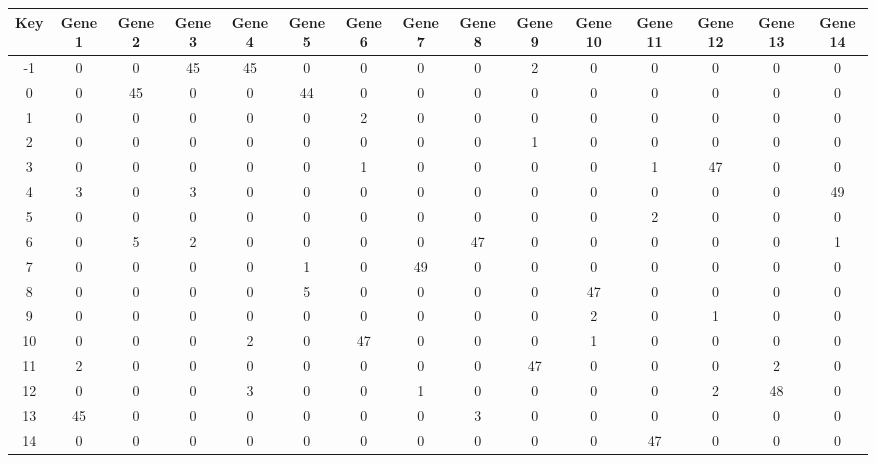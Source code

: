 \begin{tabular}{|c|c|c|c|c|c|c|c|c|c|c|c|c|c|c|}
\hline
Key & Gene 1 & Gene 2 & Gene 3 & Gene 4 & Gene 5 & Gene 6 & Gene 7 & Gene 8 & Gene 9 & Gene 10 & Gene 11 & Gene 12 & Gene 13 & Gene 14 \\
\hline
-1 & 0 & 0 & 45 & 45 & 0 & 0 & 0 & 0 & 2 & 0 & 0 & 0 & 0 & 0 \\
0 & 0 & 45 & 0 & 0 & 44 & 0 & 0 & 0 & 0 & 0 & 0 & 0 & 0 & 0 \\
1 & 0 & 0 & 0 & 0 & 0 & 2 & 0 & 0 & 0 & 0 & 0 & 0 & 0 & 0 \\
2 & 0 & 0 & 0 & 0 & 0 & 0 & 0 & 0 & 1 & 0 & 0 & 0 & 0 & 0 \\
3 & 0 & 0 & 0 & 0 & 0 & 1 & 0 & 0 & 0 & 0 & 1 & 47 & 0 & 0 \\
4 & 3 & 0 & 3 & 0 & 0 & 0 & 0 & 0 & 0 & 0 & 0 & 0 & 0 & 49 \\
5 & 0 & 0 & 0 & 0 & 0 & 0 & 0 & 0 & 0 & 0 & 2 & 0 & 0 & 0 \\
6 & 0 & 5 & 2 & 0 & 0 & 0 & 0 & 47 & 0 & 0 & 0 & 0 & 0 & 1 \\
7 & 0 & 0 & 0 & 0 & 1 & 0 & 49 & 0 & 0 & 0 & 0 & 0 & 0 & 0 \\
8 & 0 & 0 & 0 & 0 & 5 & 0 & 0 & 0 & 0 & 47 & 0 & 0 & 0 & 0 \\
9 & 0 & 0 & 0 & 0 & 0 & 0 & 0 & 0 & 0 & 2 & 0 & 1 & 0 & 0 \\
10 & 0 & 0 & 0 & 2 & 0 & 47 & 0 & 0 & 0 & 1 & 0 & 0 & 0 & 0 \\
11 & 2 & 0 & 0 & 0 & 0 & 0 & 0 & 0 & 47 & 0 & 0 & 0 & 2 & 0 \\
12 & 0 & 0 & 0 & 3 & 0 & 0 & 1 & 0 & 0 & 0 & 0 & 2 & 48 & 0 \\
13 & 45 & 0 & 0 & 0 & 0 & 0 & 0 & 3 & 0 & 0 & 0 & 0 & 0 & 0 \\
14 & 0 & 0 & 0 & 0 & 0 & 0 & 0 & 0 & 0 & 0 & 47 & 0 & 0 & 0 \\
\hline
\end{tabular}